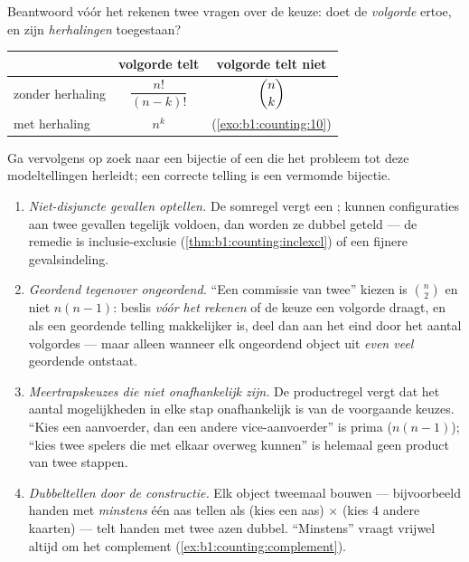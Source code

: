\begin{method}\label{met:b1:counting:which}
Beantwoord vóór het rekenen twee vragen over de keuze: doet de
\emph{volgorde} ertoe, en zijn \emph{herhalingen} toegestaan?
\begin{center}
\renewcommand{\arraystretch}{1.4}
\begin{tabular}{l|c|c}
 & volgorde telt & volgorde telt niet \\
\hline
zonder herhaling & $\dfrac{n!}{(n-k)!}$ & $\dbinom{n}{k}$ \\[6pt]
met herhaling & $n^k$ & (\cref{exo:b1:counting:10}) \\
\end{tabular}
\end{center}
Ga vervolgens op zoek naar een bijectie of een  die het probleem
tot deze modeltellingen herleidt; een correcte telling is een vermomde
bijectie.
\end{method}

\begin{remark}\label{rem:b1:counting:pitfalls}
\begin{enumerate}
  \item \emph{Niet-disjuncte gevallen optellen.} De somregel vergt een
        ; kunnen configuraties aan twee gevallen tegelijk
        voldoen, dan worden ze dubbel geteld --- de remedie is
        inclusie-exclusie (\cref{thm:b1:counting:inclexcl}) of een
        fijnere gevalsindeling.
  \item \emph{Geordend tegenover ongeordend.} ``Een commissie van
        twee'' kiezen is $\binom n2$ en niet $n(n-1)$: beslis
        \emph{vóór het rekenen} of de keuze een volgorde draagt, en
        als een geordende telling makkelijker is, deel dan aan het
        eind door het aantal volgordes --- maar alleen wanneer elk
        ongeordend object uit \emph{even veel} geordende ontstaat.
  \item \emph{Meertrapskeuzes die niet onafhankelijk zijn.} De
        productregel vergt dat het aantal mogelijkheden in elke stap
        onafhankelijk is van de voorgaande keuzes. ``Kies een
        aanvoerder, dan een andere vice-aanvoerder'' is prima
        ($n(n-1)$); ``kies twee spelers die met elkaar overweg
        kunnen'' is helemaal geen product van twee stappen.
  \item \emph{Dubbeltellen door de constructie.} Elk object tweemaal
        bouwen --- bijvoorbeeld handen met \emph{minstens} één aas
        tellen als (kies een aas) $\times$ (kies $4$ andere kaarten)
        --- telt handen met twee azen dubbel. ``Minstens'' vraagt
        vrijwel altijd om het complement
        (\cref{ex:b1:counting:complement}).
\end{enumerate}
\end{remark}

